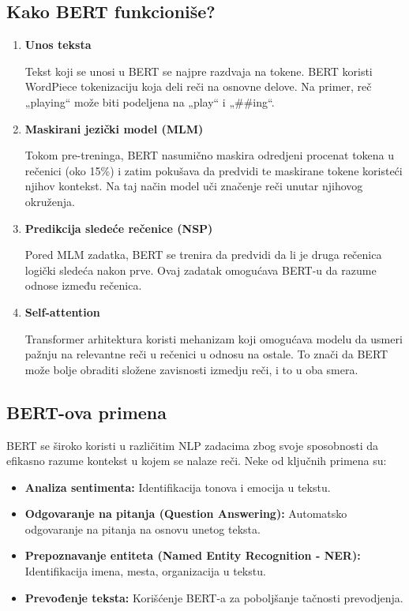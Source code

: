 \documentclass{article}
\begin{document}
\subsection{Kako BERT funkcioniše?}
\begin{enumerate}
\item  \textbf{Unos teksta}

Tekst koji se unosi u BERT se najpre razdvaja na tokene. BERT koristi WordPiece tokenizaciju koja deli reči na osnovne delove. Na primer, reč „playing“ može biti podeljena na „play“ i „##ing“.
\newpage
\item \textbf{Maskirani jezički model (MLM)}

Tokom pre-treninga, BERT nasumično maskira odredjeni procenat tokena u rečenici (oko 15\%) i zatim pokušava da predvidi te maskirane tokene koristeći njihov kontekst. Na taj način model uči značenje reči unutar njihovog okruženja.
\item \textbf{Predikcija sledeće rečenice (NSP)}

Pored MLM zadatka, BERT se trenira da predvidi da li je druga rečenica logički sledeća nakon prve. Ovaj zadatak omogućava BERT-u da razume odnose između rečenica.

\item \textbf{Self-attention}

Transformer arhitektura koristi mehanizam koji omogućava modelu da usmeri pažnju na relevantne reči u rečenici u odnosu na ostale. To znači da BERT može bolje obraditi složene zavisnosti izmedju reči, i to u oba smera.
\end{enumerate}
\subsection{BERT-ova primena}

BERT se široko koristi u različitim NLP zadacima zbog svoje sposobnosti da efikasno razume kontekst u kojem se nalaze reči. Neke od ključnih primena su:
\begin{itemize}
    \item \textbf{Analiza sentimenta:} Identifikacija tonova i emocija u tekstu.
    \item  \textbf{Odgovaranje na pitanja (Question Answering):} Automatsko odgovaranje na pitanja na osnovu unetog teksta.
    \item \textbf{Prepoznavanje entiteta (Named Entity Recognition - NER):} Identifikacija imena, mesta, organizacija u tekstu.
    \item \textbf{Prevođenje teksta: }Korišćenje BERT-a za poboljšanje tačnosti prevodjenja.
\end{itemize}
\end{document}
